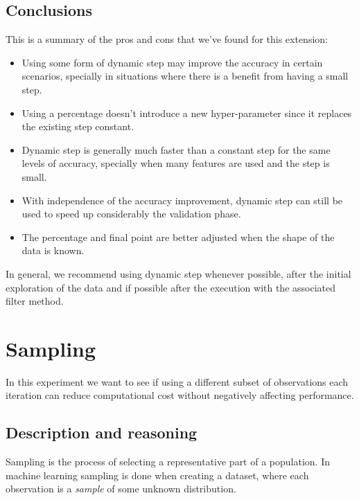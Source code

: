 \subsection{Conclusions}

This is a summary of the pros and cons that we've found for this extension:

\begin{itemize}
    \item Using some form of dynamic step may improve the accuracy in certain sce\-nar\-ios, specially in situations where there is a benefit from having a small step.
    \item Using a percentage doesn't introduce a new hyper-parameter since it replaces the existing step constant.
    \item Dynamic step is generally much faster than a constant step for the same levels of accuracy, specially when many features are used and the step is small.
    \item With independence of the accuracy improvement, dynamic step can still be used to speed up considerably the validation phase.
    \item The percentage and final point are better adjusted when the shape of the data is known.
\end{itemize}

In general, we recommend using dynamic step whenever possible, after the initial exploration of the data and if possible after the execution with the associated filter method.


\section{Sampling}

In this experiment we want to see if using a different subset of observations each iteration can reduce computational cost without negatively affecting performance.

\subsection{Description and reasoning}
\label{sec:ch5.sampling.desc}

Sampling is the process of selecting a representative part of a population. In machine learning sampling is done when creating a dataset, where each observation is a \emph{sample} of some unknown distribution. 

